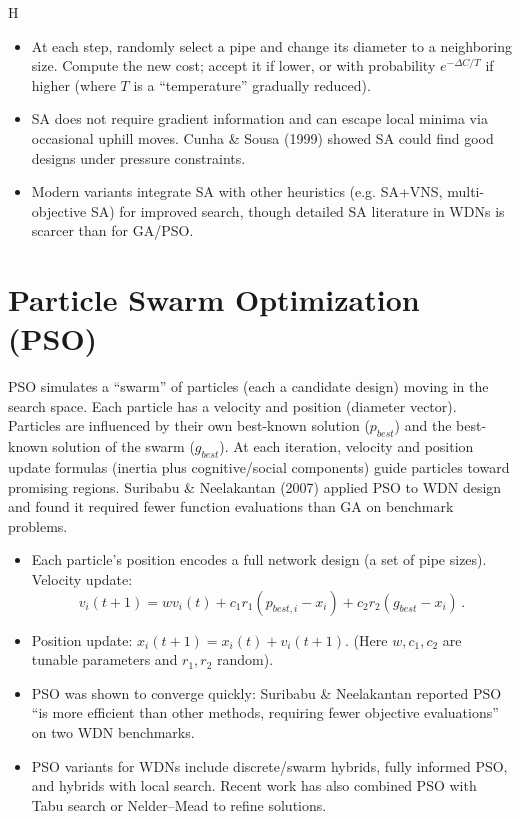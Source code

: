 H\documentclass[12pt, a4paper]{article}
\begin{document}
\begin{itemize}
    \item At each step, randomly select a pipe and change its diameter to a neighboring size. Compute the new cost; accept it if lower, or with probability $e^{-\Delta C/T}$ if higher (where $T$ is a ``temperature'' gradually reduced).
    \item SA does not require gradient information and can escape local minima via occasional uphill moves. Cunha \& Sousa (1999) showed SA could find good designs under pressure constraints\cite{ref4}.
    \item Modern variants integrate SA with other heuristics (e.g. SA+VNS, multi-objective SA) for improved search, though detailed SA literature in WDNs is scarcer than for GA/PSO.
\end{itemize}

\section*{Particle Swarm Optimization (PSO)}
PSO simulates a ``swarm'' of particles (each a candidate design) moving in the search space. Each particle has a velocity and position (diameter vector). Particles are influenced by their own best-known solution ($p_{best}$) and the best-known solution of the swarm ($g_{best}$). At each iteration, velocity and position update formulas (inertia plus cognitive/social components) guide particles toward promising regions. Suribabu \& Neelakantan (2007) applied PSO to WDN design\cite{ref5} and found it required fewer function evaluations than GA on benchmark problems.

\begin{itemize}
    \item Each particle's position encodes a full network design (a set of pipe sizes). Velocity update: 
    $$v_{i}(t+1) = w v_i(t) + c_1 r_1 (p_{best,i} - x_i) + c_2 r_2 (g_{best} - x_i)\,.$$
    \item Position update: $x_i(t+1)=x_i(t)+v_i(t+1)$. (Here $w,c_1,c_2$ are tunable parameters and $r_1,r_2$ random).
    \item PSO was shown to converge quickly: Suribabu \& Neelakantan reported PSO ``is more efficient than other methods, requiring fewer objective evaluations'' on two WDN benchmarks\cite{ref5}.
    \item PSO variants for WDNs include discrete/swarm hybrids, fully informed PSO, and hybrids with local search. Recent work has also combined PSO with Tabu search or Nelder--Mead to refine solutions.
\end{itemize}
\end{document}
